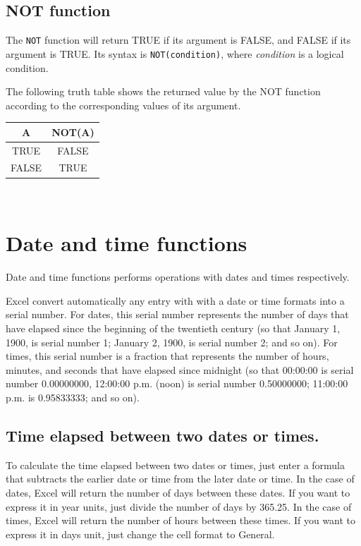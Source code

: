 \subsection{NOT function}\hypertarget{not-function}{}\label{not-function}

The \texttt{NOT} function will return TRUE if its argument is FALSE, and FALSE if its argument is TRUE. Its syntax is \texttt{NOT(condition)}, where \emph{condition} is a logical condition.

The following truth table shows the returned value by the NOT function according to the corresponding values of its
argument.

\begin{longtable}{|c|c|}
\hline
A & NOT(A)\\
\hline
TRUE & FALSE\\
FALSE & TRUE\\
\hline
\end{longtable}

~{}

\section{Date and time functions}\hypertarget{date-and-time-functions}{}\label{date-and-time-functions}

Date and time functions performs operations with dates and times respectively.

Excel convert automatically any entry with with a date or time formats into a serial number. For dates, this serial number represents the number of days that have elapsed since the beginning of the twentieth century (so that January 1, 1900, is serial number 1; January 2, 1900, is serial number 2; and so on). For times, this serial number is a fraction that represents the number of hours, minutes, and seconds that have elapsed since midnight (so that  00:00:00 is serial number 0.00000000, 12:00:00 p.m. (noon) is serial number 0.50000000; 11:00:00 p.m. is 0.95833333; and so on).

\subsection{Time elapsed between two dates or times.}\hypertarget{time-elapsed-between-two-dates-or-times}{}\label{time-elapsed-between-two-dates-or-times}

To calculate the time elapsed between two dates or times, just enter a formula that subtracts the earlier date or time from the later date or time.
In the case of dates, Excel will return the number of days between these dates. If you want to express it in year units, just divide the number of days by 365.25. In the case of times, Excel will return the number of hours between these times. If you want to express it in days unit, just change the cell format to General.

